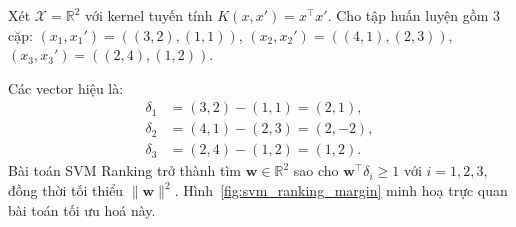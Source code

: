 \begin{example}
Xét $\mathcal{X} = \mathbb{R}^2$ với kernel tuyến tính 
$K(x,x') = x^\top x'$. Cho tập huấn luyện gồm 3 cặp:
$(x_1, x_1') = ((3,2),(1,1))$, 
$(x_2, x_2') = ((4,1),(2,3))$, 
$(x_3, x_3') = ((2,4),(1,2))$.

Các vector hiệu là:
\begin{align*}
  \delta_1 &= (3,2) - (1,1) = (2,1), \\
  \delta_2 &= (4,1) - (2,3) = (2,-2), \\
  \delta_3 &= (2,4) - (1,2) = (1,2).
\end{align*}
Bài toán SVM Ranking trở thành tìm $\mathbf{w} \in \mathbb{R}^2$ 
sao cho $\mathbf{w}^\top \delta_i \geq 1$ với $i = 1,2,3$, 
đồng thời tối thiểu $\|\mathbf{w}\|^2$.
Hình~\ref{fig:svm_ranking_margin} minh hoạ 
trực quan bài toán tối ưu hoá này.
\end{example}

